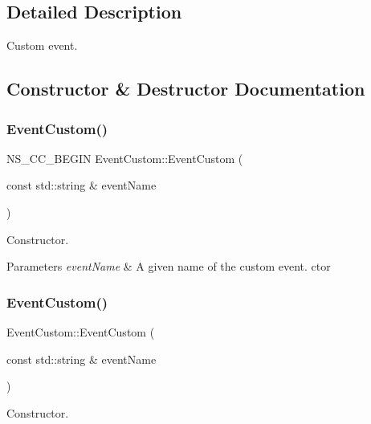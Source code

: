 \subsection{Detailed Description}
Custom event. 

\subsection{Constructor \& Destructor Documentation}
\mbox{\label{classEventCustom_ac8691ca37cf1cd481c3308a3a8df9cdf}} 
\subsubsection{\texorpdfstring{Event\+Custom()}{EventCustom()}\hspace{0.1cm}{\footnotesize\ttfamily [1/2]}}
{\footnotesize\ttfamily N\+S\+\_\+\+C\+C\+\_\+\+B\+E\+G\+IN Event\+Custom\+::\+Event\+Custom (\begin{DoxyParamCaption}\item[{const std\+::string \&}]{event\+Name }\end{DoxyParamCaption})}

Constructor.


\begin{DoxyParams}{Parameters}
{\em event\+Name} & A given name of the custom event.  ctor \\
\hline
\end{DoxyParams}
\mbox{\label{classEventCustom_ab241d76c49f15b3e90a877371cc5c016}} 
\subsubsection{\texorpdfstring{Event\+Custom()}{EventCustom()}\hspace{0.1cm}{\footnotesize\ttfamily [2/2]}}
{\footnotesize\ttfamily Event\+Custom\+::\+Event\+Custom (\begin{DoxyParamCaption}\item[{const std\+::string \&}]{event\+Name }\end{DoxyParamCaption})}

Constructor.


